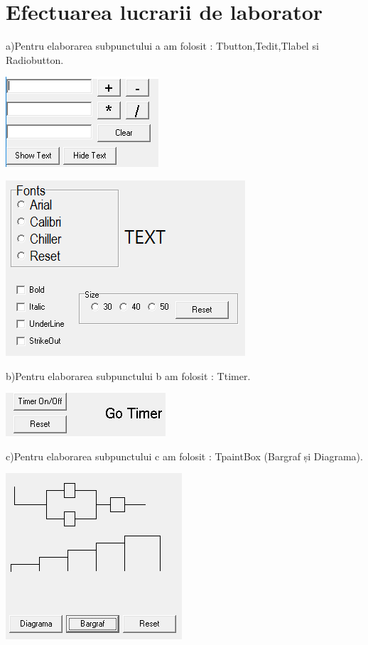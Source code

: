 \section{Efectuarea lucrarii de laborator}
a)Pentru elaborarea subpunctului a am folosit : Tbutton,Tedit,Tlabel si Radiobutton.\\
\begin{center}
\includegraphics[scale=1]{images/a}\\
\end{center}
\begin{center}
\includegraphics[scale=1]{images/a1}\\
\end{center}

b)Pentru elaborarea subpunctului b am folosit : Ttimer.\\
\begin{center}
\includegraphics[scale=1]{images/b}\\
\end{center}

c)Pentru elaborarea subpunctului c am folosit : TpaintBox (Bargraf și Diagrama).\\
\begin{center}
\includegraphics[scale=1]{images/c}\\
\end{center}

